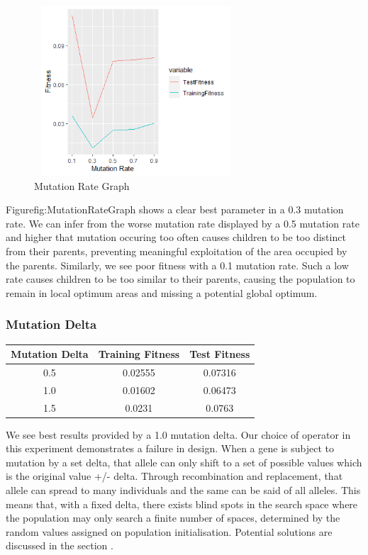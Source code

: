 \documentclass[sigconf]{acmart}
\begin{document}
\begin{figure}[!htb]
\includegraphics[height=2.5in,width=3in]{MutationRateGraph}
\caption{Mutation Rate Graph}
\label{fig:MutationRateGraph}
\end{figure}
Figure{fig:MutationRateGraph} shows a clear best parameter in a 0.3 mutation rate. We can infer from the worse mutation rate displayed by a 0.5 mutation rate and higher that mutation occuring too often causes children to be too distinct from their parents, preventing meaningful exploitation of the area occupied by the parents. Similarly, we see poor fitness with a 0.1 mutation rate. Such a low rate causes children to be too similar to their parents, causing the population to remain in local optimum areas and missing a potential global optimum.
\subsubsection{Mutation Delta}
\begin{center}
\begin{tabular} {|c|c|c|}
\hline
Mutation Delta& Training Fitness & Test Fitness \\
\hline
0.5 & 0.02555 & 0.07316 \\
1.0 & 0.01602 & 0.06473 \\
1.5 & 0.0231 & 0.0763 \\

\hline

\end{tabular}
\end{center}
We see best results provided by a 1.0 mutation delta. 
Our choice of operator in this experiment demonstrates a failure in design. When a gene is subject to mutation by a set delta, that allele can only shift to a set of possible values which is the original value +/- delta. Through recombination and replacement, that allele can spread to many individuals and the same can be said of all alleles. This means that, with a fixed delta, there exists blind spots in the search space where the population may only search a finite number of spaces, determined by the random values assigned on population initialisation. Potential solutions are discussed in the section .
\end{document}
